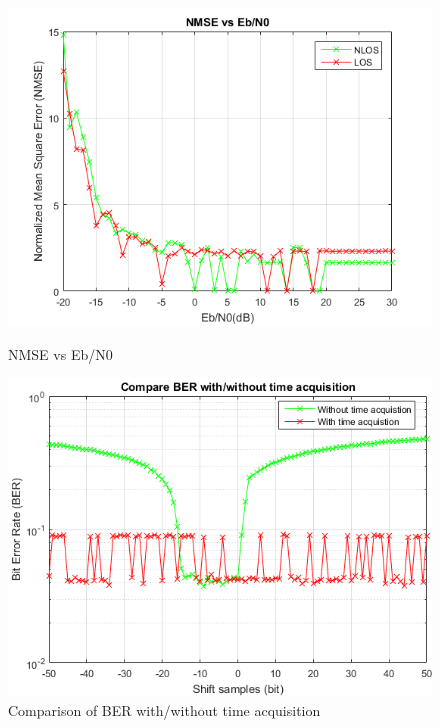\documentclass[a4paper]{article}
\begin{document}
    \begin{figure}[h]
		\begin{minipage}[t]{0.5\linewidth}
			\centering
			\includegraphics[scale=0.5]{figures/NMSEvsEbN0.png}
			\centering
			\caption{NMSE vs Eb/N0}
            \label{fig:NMSETA}
		\end{minipage}
		\begin{minipage}[t]{0.5\linewidth}
			\centering
			\includegraphics[scale=0.5]{figures/compareBER.png}
			\centering
			\caption{Comparison of BER with/without time acquisition}
            \label{fig:compareBER}
		\end{minipage}
	\end{figure}
    
\end{document}
